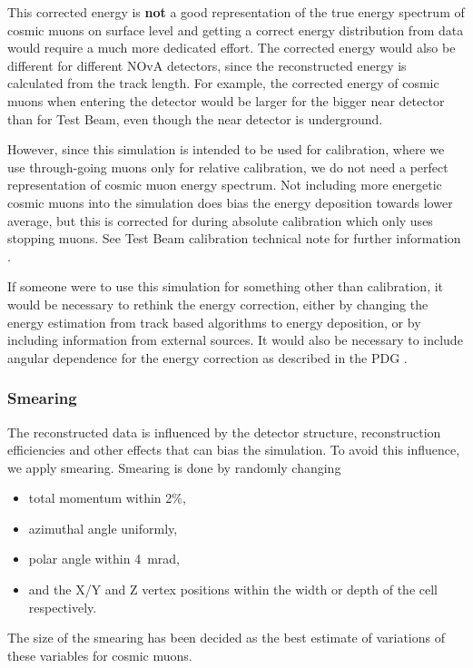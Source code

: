 \documentclass[12pt]{article}
\begin{document}
This corrected energy is \textbf{not} a good representation of the true energy spectrum of cosmic muons on surface level and getting a correct energy distribution from data would require a much more dedicated effort. The corrected energy would also be different for different NOvA detectors, since the reconstructed energy is calculated from the track length. For example, the corrected energy of cosmic muons when entering the detector would be larger for the bigger near detector than for Test Beam, even though the near detector is underground. 

However, since this simulation is intended to be used for calibration, where we use through-going muons only for relative calibration, we do not need a perfect representation of cosmic muon energy spectrum. Not including more energetic cosmic muons into the simulation does bias the energy deposition towards lower average, but this is corrected for during absolute calibration which only uses stopping muons. See Test Beam calibration technical note for further information \cite{NOVA-doc-60592}.

If someone were to use this simulation for something other than calibration, it would be necessary to rethink the energy correction, either by changing the energy estimation from track based algorithms to energy deposition, or by including information from external sources. It would also be necessary to include angular dependence for the energy correction as described in the PDG \cite{rpp2022-rev-cosmic-rays.pdf}.

\subsubsection{Smearing}
The reconstructed data is influenced by the detector structure, reconstruction efficiencies and other effects that can bias the simulation. To avoid this influence, we apply smearing. Smearing is done by randomly changing
\begin{itemize}
\item total momentum within 2\%,
\item azimuthal angle uniformly,
\item polar angle within 4~mrad,
\item and the X/Y and Z vertex positions within the width or depth of the cell respectively.
\end{itemize}

The size of the smearing has been decided as the best estimate of variations of these variables for cosmic muons.
\end{document}
